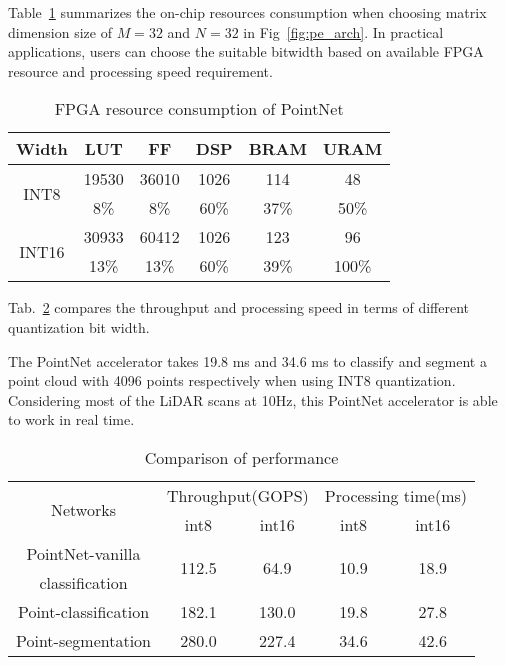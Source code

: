 \documentclass[conference]{IEEEtran}
\begin{document}
Table~\ref{tab:bitwidth} summarizes the on-chip resources consumption when choosing matrix dimension size of $M=32$ and $N=32$ in Fig~\ref{fig:pe_arch}. In practical applications, users can choose the suitable bitwidth based on available FPGA resource and processing speed requirement.

\begin{table}[htbp]
    \centering
    \caption{FPGA resource consumption of PointNet}
    \begin{tabular}{ |c|c|c|c|c|c| } 
        \hline
        Width & LUT & FF & DSP & BRAM & URAM \\
        \hline
        \multirow{2}{*}{INT8} & 19530 & 36010 & 1026 & 114 & 48\\
                              & 8\%   & 8\%   & 60\% & 37\%& 50\%\\ 
        \hline
        \multirow{2}{*}{INT16} & 30933 & 60412 & 1026 & 123 & 96\\ 
                               & 13\%  & 13\%  & 60\% & 39\%& 100\%\\ 
        \hline
    \end{tabular}
    \label{tab:bitwidth}
\end{table}

Tab.~\ref{tab:perform} compares the throughput and processing speed in terms of different quantization bit width.
\begin{comment}
Considering the processing time of ARM (22.3ms in average), 
\end{comment}
The PointNet accelerator takes 19.8 ms and 34.6 ms to classify and segment a point cloud with 4096 points respectively when using INT8 quantization. Considering most of the LiDAR scans at 10Hz, this PointNet accelerator is able to work in real time.

\begin{table}[htbp]
    \centering
    \caption{Comparison of performance}
    \begin{tabular}{|c|c|c|c|c|}
        \hline
        \multirow{2}{*}{Networks} & \multicolumn{2}{c|}{Throughput(GOPS)} &
        \multicolumn{2}{c|}{Processing time(ms)} \\
        \cline{2-5}
          & int8 & int16 & int8 & int16 \\
        \hline
        PointNet-vanilla   & \multirow{2}{*}{112.5} & \multirow{2}{*}{64.9} & \multirow{2}{*}{10.9} & \multirow{2}{*}{18.9} \\
         classification      &  &  &  & \\
        \hline
        Point-classification & 182.1 & 130.0 & 19.8 & 27.8\\
        \hline
        Point-segmentation   & 280.0 & 227.4 & 34.6 & 42.6\\
        \hline
    \end{tabular}
    \label{tab:perform}
\end{table}
\end{document}
